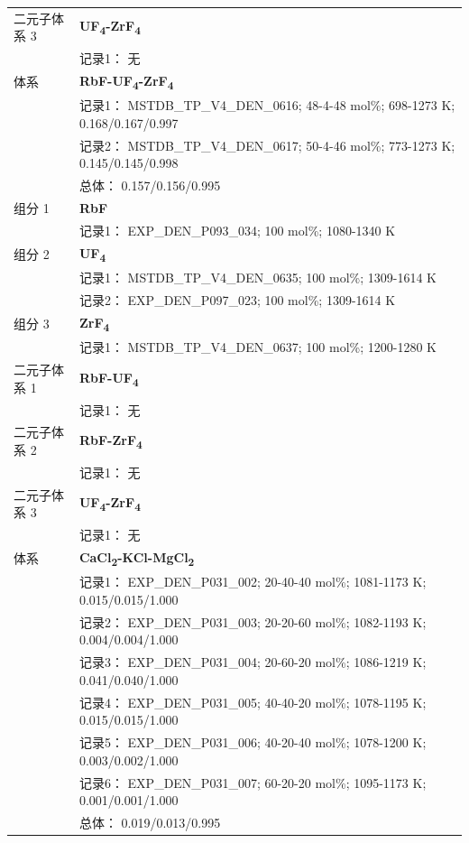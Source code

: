 \documentclass[12pt]{article}
\begin{document}
{\begin{longtable}[]{@{}
  >{\raggedright\arraybackslash}p{}
  >{\raggedright\arraybackslash}p{}@{}}
二元子体系 3 & \textbf{UF\textsubscript{4}-ZrF\textsubscript{4}} \\
 & 记录1： 无 \\
\midrule
体系 & \textbf{RbF-UF\textsubscript{4}-ZrF\textsubscript{4}} \\
 & 记录1： MSTDB\_TP\_V4\_DEN\_0616; 48-4-48 mol\%; 698-1273 K; 0.168/0.167/0.997 \\
 & 记录2： MSTDB\_TP\_V4\_DEN\_0617; 50-4-46 mol\%; 773-1273 K; 0.145/0.145/0.998 \\
 & 总体： 0.157/0.156/0.995  \\

组分 1  & \textbf{RbF} \\
 & 记录1： EXP\_DEN\_P093\_034; 100 mol\%; 1080-1340 K  \\

组分 2  & \textbf{UF\textsubscript{4}} \\
 & 记录1： MSTDB\_TP\_V4\_DEN\_0635; 100 mol\%; 1309-1614 K \\
 & 记录2： EXP\_DEN\_P097\_023; 100 mol\%; 1309-1614 K  \\

组分 3  & \textbf{ZrF\textsubscript{4}} \\
 & 记录1： MSTDB\_TP\_V4\_DEN\_0637; 100 mol\%; 1200-1280 K  \\

二元子体系 1 & \textbf{RbF-UF\textsubscript{4}} \\
 & 记录1： 无 \\
二元子体系 2 & \textbf{RbF-ZrF\textsubscript{4}} \\
 & 记录1： 无 \\
二元子体系 3 & \textbf{UF\textsubscript{4}-ZrF\textsubscript{4}} \\
 & 记录1： 无 \\
\midrule
体系 & \textbf{CaCl\textsubscript{2}-KCl-MgCl\textsubscript{2}} \\
 & 记录1： EXP\_DEN\_P031\_002; 20-40-40 mol\%; 1081-1173 K; 0.015/0.015/1.000 \\
 & 记录2： EXP\_DEN\_P031\_003; 20-20-60 mol\%; 1082-1193 K; 0.004/0.004/1.000 \\
 & 记录3： EXP\_DEN\_P031\_004; 20-60-20 mol\%; 1086-1219 K; 0.041/0.040/1.000 \\
 & 记录4： EXP\_DEN\_P031\_005; 40-40-20 mol\%; 1078-1195 K; 0.015/0.015/1.000 \\
 & 记录5： EXP\_DEN\_P031\_006; 40-20-40 mol\%; 1078-1200 K; 0.003/0.002/1.000 \\
 & 记录6： EXP\_DEN\_P031\_007; 60-20-20 mol\%; 1095-1173 K; 0.001/0.001/1.000 \\
 & 总体： 0.019/0.013/0.995  \\


\end{longtable}}
\end{document}
